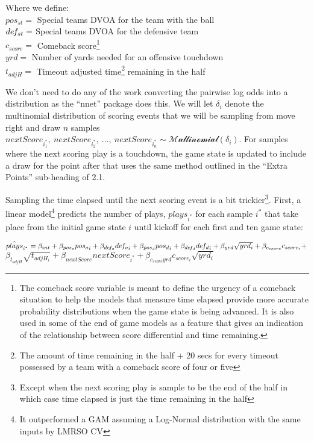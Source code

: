 \documentclass[12pt,twoside]{dukestatscithesis}
\begin{document}
Where we define:\\
\({pos_{st}} =\) Special teams DVOA for the team with the ball\\
\(de\hspace{-0.1em}f_{st} =\) Special teams DVOA for the defensive team\\
\(c_{score} =\) Comeback score\footnote{The comeback score variable is meant to define the urgency of a comeback situation to help the models that measure time elapsed provide more accurate probability distributions when the game state is being advanced. It is also used in some of the end of game models as a feature that gives an indication of the relationship between score differential and time remaining.}\\
\(yrd =\) Number of yards needed for an offensive touchdown\\
\(t_{adjH} =\) Timeout adjusted time\footnote{The amount of time remaining in the half + 20 secs for every timeout possessed by a team with a comeback score of four or five} remaining in the half

We don't need to do any of the work converting the pairwise log odds into a distribution as the ``nnet'' package does this. We will let \(\delta_i\) denote the multinomial distribution of scoring events that we will be sampling from move right and draw \(n\) samples \(nextScore_{i^*_1}, \: nextScore_{i^*_2},\: ..., \: nextScore_{i^*_n} \sim \mathcal{Multinomial}(\delta_i)\). For samples where the next scoring play is a touchdown, the game state is updated to include a draw for the point after that uses the same method outlined in the ``Extra Points'' sub-heading of 2.1.

Sampling the time elapsed until the next scoring event is a bit trickier\footnote{Except when the next scoring play is sample to be the end of the half in which case time elapsed is just the time remaining in the half}. First, a linear model\footnote{It outperformed a GAM assuming a Log-Normal distribution with the same inputs by LMRSO CV} predicts the number of plays, \(plays_{i^*}\) for each sample \(i^*\) that take place from the initial game state \(i\) until kickoff for each first and ten game state:

\(\hat{plays}_{i^*} = \beta_{int} + \beta_{pos_o}{pos_o}_i + \beta_{de\hspace{-0.1em}f_o}{de\hspace{-0.1em}f_o}_i + \beta_{pos_d}{pos_d}_i + \beta_{de\hspace{-0.1em}f_d}{de\hspace{-0.1em}f_d}_i + \beta_{yrd}\sqrt{yrd_i} + \beta_{c_{score}}c_{score_i} + \:\)
\(\beta_{t_{adjH}}\sqrt{t_{adjH_i}} + \beta_{nextScore}nextScore_{i^*} + \beta_{c_{score}yrd}c_{score_i}\sqrt{yrd_i}\)
\end{document}
